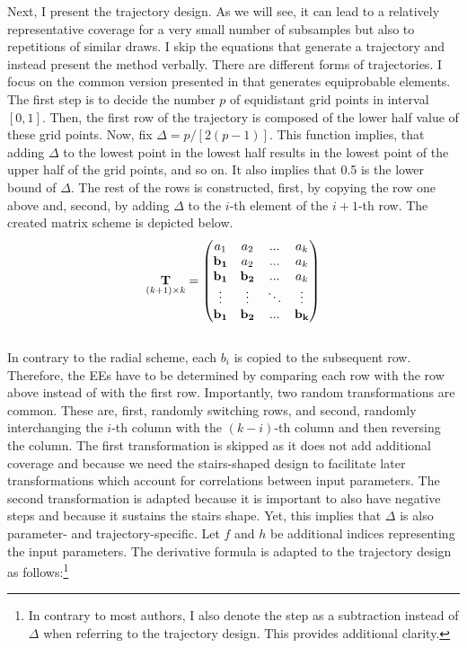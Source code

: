 \noindent
Next, I present the trajectory design. As we will see, it can lead to a relatively representative coverage for a very small number of subsamples but also to repetitions of similar draws.
I skip the equations that generate a trajectory and instead present the method verbally.
There are different forms of trajectories. I focus on the common version presented in \cite{Morris.1991} that generates equiprobable elements. The first step is to decide the number $p$ of equidistant grid points in interval $[0,1]$. Then, the first row of the trajectory is composed of the lower half value of these grid points. Now, fix $\Delta = p/[2(p-1)]$. This function implies, that adding $\Delta$ to the lowest point in the lowest half results in the lowest point of the upper half of the grid points, and so on. It also implies that 0.5 is the lower bound of $\Delta$. The rest of the rows is constructed, first, by copying the row one above and, second, by adding $\Delta$ to the $i$-th element of the $i+1$-th row. The created matrix scheme is depicted below.
\begin{align}
\underset{(k+1)\times k}{\bold{T}} =
\begin{pmatrix}
a_1 & a_2 & ... & a_k \\
\bold{b_1} & a_2 & ... & a_k \\
\bold{b_1} & \bold{b_2} & ... & a_k \\
\vdots & \vdots & 	\ddots & \vdots\\
\bold{b_1} & \bold{b_2} & ... & \bold{b_k}
\end{pmatrix}
\end{align}
\\

\noindent
In contrary to the radial scheme, each $b_i$ is copied to the subsequent row. Therefore, the EEs have to be determined by comparing each row with the row above instead of with the first row.
Importantly, two random transformations are common. These are, first, randomly switching rows, and second, randomly interchanging the $i$-th column with the $(k-i)$-th column and then reversing the column. The first transformation is skipped as it does not add additional coverage and because we need the stairs-shaped design to facilitate later transformations which account for correlations between input parameters. The second transformation is adapted because it is important to also have negative steps and because it sustains the stairs shape. Yet, this implies that $\Delta$ is also parameter- and trajectory-specific. Let $f$ and $h$ be additional indices representing the input parameters. The derivative formula is adapted to the trajectory design as follows:\footnote{In contrary to most authors, I also denote the step as a subtraction instead of $\Delta$ when referring to the trajectory design. This provides additional clarity.}

